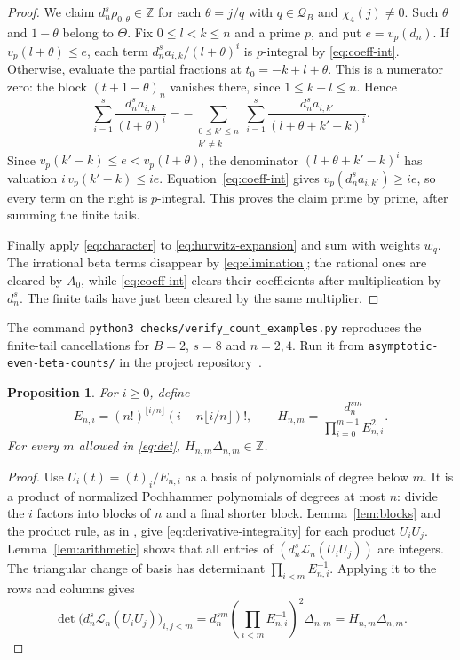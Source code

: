 \documentclass[11pt]{article}
\newtheorem{proposition}[theorem]{Proposition}
\theoremstyle{remark}
\newcommand{\Z}{\mathbb Z}
\newcommand{\Lcal}{\mathcal L}
\numberwithin{equation}{section}
\begin{document}
\begin{proof}
We claim $d_n^s\rho_{0,\theta}\in\Z$ for each $\theta=j/q$ with
$q\in\mathcal Q_B$ and $\chi_4(j)\ne0$. Such $\theta$ and $1-\theta$
belong to $\Theta$. Fix $0\leq l<k\leq n$ and a prime $p$, and put
$e=v_p(d_n)$. If $v_p(l+\theta)\leq e$, each term
$d_n^s a_{i,k}/(l+\theta)^i$ is $p$-integral by \eqref{eq:coeff-int}.
Otherwise, evaluate the partial fractions at
$t_0=-k+l+\theta$. This is a numerator zero: the block
$(t+1-\theta)_n$ vanishes there, since
$1\leq k-l\leq n$. Hence
\[
 \sum_{i=1}^s\frac{d_n^s a_{i,k}}{(l+\theta)^i}
 =-\sum_{\substack{0\leq k'\leq n\\k'\ne k}}\sum_{i=1}^s
       \frac{d_n^s a_{i,k'}}{(l+\theta+k'-k)^i}.
\]
Since $v_p(k'-k)\leq e<v_p(l+\theta)$, the denominator
$(l+\theta+k'-k)^i$ has valuation $i\,v_p(k'-k)\leq ie$.
Equation~\eqref{eq:coeff-int} gives $v_p(d_n^s a_{i,k'})\geq ie$,
so every term on the right is $p$-integral. This proves the claim
prime by prime, after summing the finite tails.

Finally apply \eqref{eq:character} to \eqref{eq:hurwitz-expansion} and
sum with weights $w_q$. The irrational beta terms disappear by
\eqref{eq:elimination}; the rational ones are cleared by $A_0$, while
\eqref{eq:coeff-int} clears their coefficients after multiplication by
$d_n^s$. The finite tails have just been cleared by the same multiplier.
\end{proof}

The command \mbox{\texttt{python3 checks/verify\_count\_examples.py}} reproduces
the finite-tail cancellations for $B=2$, $s=8$ and $n=2,4$. Run it from
\texttt{asymptotic-even-beta-counts/} in the project repository~\cite{beta4repo}.

\begin{proposition}\label{prop:integerizer}
For $i\geq0$, define
\[
 E_{n,i}=(n!)^{\lfloor i/n\rfloor}(i-n\lfloor i/n\rfloor)!,\qquad
 H_{n,m}=\frac{d_n^{sm}}{\prod_{i=0}^{m-1}E_{n,i}^2}.
\]
For every $m$ allowed in \eqref{eq:det}, $H_{n,m}\Delta_{n,m}\in\Z$.
\end{proposition}
\begin{proof}
Use $U_i(t)=(t)_i/E_{n,i}$ as a basis of polynomials of degree below $m$.
It is a product of normalized Pochhammer polynomials of degrees at most
$n$: divide the $i$ factors into blocks of $n$ and a final shorter block.
Lemma~\ref{lem:blocks} and the product rule, as in
\cite[Proposition~3.2]{FLSZ}, give \eqref{eq:derivative-integrality} for
each product $U_iU_j$. Lemma~\ref{lem:arithmetic} shows that all entries of
$(d_n^s\Lcal_n(U_iU_j))$ are integers. The triangular change of basis
has determinant $\prod_{i<m}E_{n,i}^{-1}$. Applying it to the rows and
columns gives
\[
 \det\bigl(d_n^s\Lcal_n(U_iU_j)\bigr)_{i,j<m}
   =d_n^{sm}\left(\prod_{i<m}E_{n,i}^{-1}\right)^2\Delta_{n,m}
   =H_{n,m}\Delta_{n,m}.
\]
\end{proof}
\end{document}
